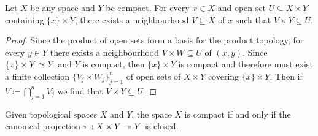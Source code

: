 \begin{lemma}
\label{lem:tube-lemma}
Let \(X\) be any space and \(Y\) be compact. For every \(x \in X\) and open set
\(U \subseteq X \times Y\) containing \(\{x\} \times Y\), there exists a
neighbourhood \(V \subseteq X\) of \(x\) such that \(V \times Y \subseteq U\).
\end{lemma}

\begin{proof}
Since the product of open sets form a basis for the product topology, for every
\(y \in Y\) there exists a neighbourhood \(V \times W \subseteq U\) of
\((x, y)\). Since \(\{x\} \times Y \simeq Y\) and \(Y\) is compact, then
\(\{x\} \times Y\) is compact and therefore must exist a finite collection
\(\{V_j \times W_j\}_{j=1}^n\) of open sets of \(X \times Y\) covering
\(\{x\} \times Y\). Then if \(V \coloneq \bigcap_{j=1}^n V_j\) we find that
\(V \times Y \subseteq U\).
\end{proof}

\begin{theorem}
\label{prop:compact-iff-projection-closed}
Given topological spaces \(X\) and \(Y\), the space \(X\) is compact if and only
if the canonical projection \(\pi: X \times Y \twoheadrightarrow Y\) is closed.
\end{theorem}

